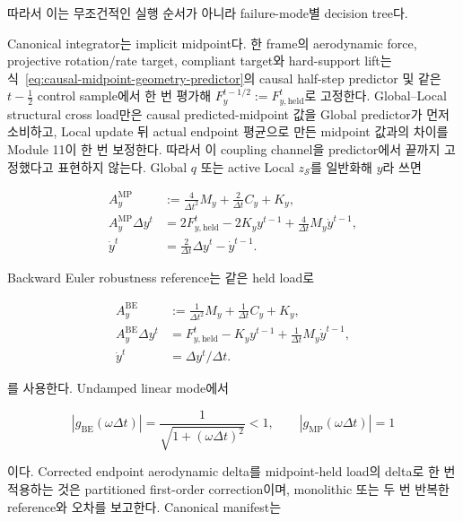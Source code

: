 \documentclass[11pt,a4paper]{article}
\begin{document}
따라서 이는 무조건적인 실행 순서가 아니라 failure-mode별 decision tree다.

Canonical integrator는 implicit midpoint다. 한 frame의 aerodynamic force,
projective rotation/rate target, compliant target와 hard-support lift는
식~\eqref{eq:causal-midpoint-geometry-predictor}의 causal half-step predictor 및
같은 \(t-\tfrac12\) control sample에서 한 번 평가해
\(F_y^{t-1/2}:=F_{y,\mathrm{held}}^t\)로 고정한다.
Global--Local structural cross load만은 causal predicted-midpoint 값을 Global predictor가 먼저 소비하고,
Local update 뒤 actual endpoint 평균으로 만든 midpoint 값과의 차이를 Module 11이 한 번 보정한다.
따라서 이 coupling channel을 predictor에서 끝까지 고정했다고 표현하지 않는다.
Global \(q\) 또는 active Local \(z_{\mathcal S}\)를 일반화해 \(y\)라 쓰면

\begin{equation}
\begin{aligned}
  A_y^{\mathrm{MP}}
  &:=\frac{4}{\Delta t^2}M_y+\frac{2}{\Delta t}C_y+K_y,\\
  A_y^{\mathrm{MP}}\Delta y^t
  &=2F_{y,\mathrm{held}}^t-2K_yy^{t-1}
    +\frac{4}{\Delta t}M_y\dot y^{t-1},\\
  \dot y^t&=\frac{2}{\Delta t}\Delta y^t-\dot y^{t-1}.
  \label{eq:midpoint-effective-update}
\end{aligned}
\end{equation}

Backward Euler robustness reference는 같은 held load로

\begin{equation}
\begin{aligned}
  A_y^{\mathrm{BE}}
  &:=\frac{1}{\Delta t^2}M_y+\frac{1}{\Delta t}C_y+K_y,\\
  A_y^{\mathrm{BE}}\Delta y^t
  &=F_{y,\mathrm{held}}^t-K_yy^{t-1}
    +\frac{1}{\Delta t}M_y\dot y^{t-1},\\
  \dot y^t&=\Delta y^t/\Delta t.
  \label{eq:backward-euler-reference-update}
\end{aligned}
\end{equation}

를 사용한다. Undamped linear mode에서

\begin{equation}
  |g_{\mathrm{BE}}(\omega\Delta t)|
  =\frac{1}{\sqrt{1+(\omega\Delta t)^2}}<1,
  \qquad |g_{\mathrm{MP}}(\omega\Delta t)|=1
  \label{eq:integrator-modal-amplification}
\end{equation}

이다. Corrected endpoint aerodynamic delta를 midpoint-held load의 delta로 한 번 적용하는 것은
partitioned first-order correction이며, monolithic 또는 두 번 반복한 reference와 오차를 보고한다.
Canonical manifest는
\end{document}
